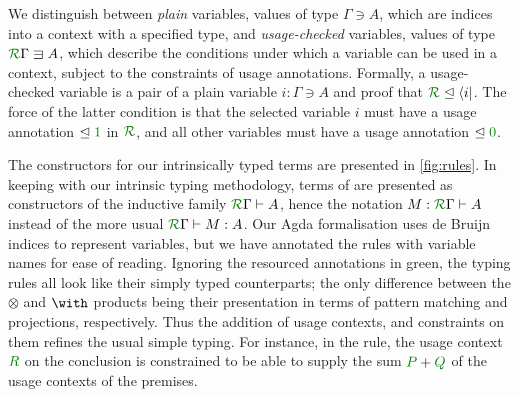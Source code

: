 \documentclass[submission,copyright,creativecommons]{eptcs}
\begin{document}
We distinguish between \emph{plain} variables, values of type
$\Gamma \ni A$, which are indices into a context with a specified
type, and \emph{usage-checked} variables, values of type
$\ctx{\Gamma}{R} \lvar A$, which describe the conditions under which a
variable can be used in a context, subject to the constraints of usage
annotations. Formally, a usage-checked variable is a pair of a plain
variable $i : \Gamma \ni A$ and proof that
$\resctx R \subres \langle i \rvert$. The force of the latter
condition is that the selected variable $i$ must have a usage
annotation $\subres \rescomment 1$ in $\resctx{R}$, and all other
variables must have a usage annotation $\subres \rescomment 0$.




The constructors for our intrinsically typed terms are presented in \autoref{fig:rules}.
In keeping with our intrinsic typing methodology, terms of \name{} are presented as constructors of the inductive family $\ctx\Gamma{R} \vdash A$, hence the notation $M : \ctx\Gamma{R} \vdash A$ instead of the more usual $\ctx\Gamma{R} \vdash M : A$. 
Our Agda formalisation uses de Bruijn indices to represent variables, but we have annotated the rules with variable names for ease of reading. 
Ignoring the resourced annotations in green, the typing rules all look
like their simply typed counterparts; the only difference between the
$\otimes$ and $\with$ products being their presentation in terms of
pattern matching and projections, respectively. Thus the addition of
usage contexts, and constraints on them refines the usual simple
typing. For instance, in the  rule, the usage
context $\rescomment R$ on the conclusion is constrained to be able to
supply the sum $\rescomment P + \rescomment Q$ of the usage contexts
of the premises.
\end{document}
